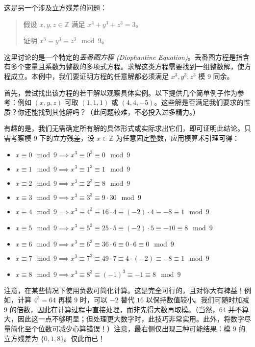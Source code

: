 \begin{example}
    这是另一个涉及立方残差的问题：
    \begin{quotation}
        假设 $x, y, z \in \mathbb{Z}$ 满足 $x^3+y^3+z^3=3$。

        证明 $x^3 \equiv y^3 \equiv z^3 \mod 9$。
    \end{quotation}

    这里讨论的是一个特定的\emph{丢番图方程 (Diophantine Equation)}。丢番图方程是指含有多个变量且系数为整数的多项式方程。求解这类方程需要找到一组整数解，使方程成立。本例中，我们要证明方程的任意解都必须满足 $x^3, y^3, z^3$ 模 $9$ 同余。

    首先，尝试找出该方程的若干解以观察具体实例。以下提供几个简单例子作为参考：例如 $(x, y, z)$ 可取 $(1, 1, 1)$ 或 $(4, 4, -5)$。这些解是否满足我们要求的性质？你还能找到其他解吗？（此问题较难，不必投入过多精力。）

    有趣的是，我们无需确定所有解的具体形式或实际求出它们，即可证明此结论。只需考察模 $9$ 下的立方残差，设 $x \in \mathbb{Z}$ 为任意固定整数，应用模算术引理可得：
    \begin{itemize}
        \item $x \equiv 0 \mod 9 \implies x^3 \equiv 0^3 \equiv 0 \mod 9$
        \item $x \equiv 1 \mod 9 \implies x^3 \equiv 1^3 \equiv 1 \mod 9$
        \item $x \equiv 2 \mod 9 \implies x^3 \equiv 2^3 \equiv 8 \mod 9$
        \item $x \equiv 3 \mod 9 \implies x^3 \equiv 3^3 \equiv 9 \cdot 3 0 \mod 9$
        \item $x \equiv 4 \mod 9 \implies x^3 \equiv 4^3 \equiv 16 \cdot 4 \equiv (-2) \cdot 4 \equiv -8 \equiv 1 \mod 9$
        \item $x \equiv 5 \mod 9 \implies x^3 \equiv 5^3 \equiv 25 \cdot 5 \equiv (-2) \cdot 5 \equiv -10 \equiv 8 \mod 9$
        \item $x \equiv 6 \mod 9 \implies x^3 \equiv 6^3 \equiv 36 \cdot 6 \equiv 0 \cdot 6 \equiv 0 \mod 9$
        \item $x \equiv 7 \mod 9 \implies x^3 \equiv 7^3 \equiv 49 \cdot 7 \equiv 4 \cdot (-2) \equiv -8 \equiv 1 \mod 9$
        \item $x \equiv 8 \mod 9 \implies x^3 \equiv 8^3 \equiv (-1)^3 \equiv -1 \equiv 8 \mod 9$
    \end{itemize}
    注意，在某些情况下使用负数可简化计算。这是完全可行的，且对你大有裨益！例如，计算 $4^3 = 64$ 再模 $9$ 时，可以 $-2$ 替代 $16$ 以保持数值较小。我们可随时加减 $9$ 的倍数，因此在计算过程中直接处理，而非先得大数再取模。（当然，$64$ 并不算大，因此这一点不够明显；但处理更大数字时，此技巧非常实用。此外，将数字尽量简化至个位数可减少心算错误！）注意，最右侧仅出现三种可能结果：模 $9$ 的立方残差为 $\{0, 1, 8\}$。仅此而已！


\end{example}

